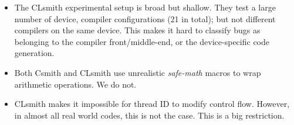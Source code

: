 \begin{itemize}
	\item The CLsmith experimental setup is broad but shallow. They test a large number of device, compiler configurations (21 in total); but not different compilers on the same device. This makes it hard to classify bugs as belonging to the compiler front/middle-end, or the device-specific code generation.
	\item Both Csmith and CLsmith use unrealistic \emph{safe-math} macros to wrap arithmetic operations. We do not.
	\item CLsmith makes it impossible for thread ID to modify control flow. However, in almost all real world codes, this is not the case. This is a big restriction.
\end{itemize}
